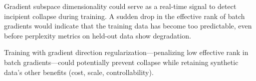  Gradient subspace dimensionality could serve as a real-time signal to detect incipient collapse during training. A sudden drop in the effective rank of batch gradients would indicate that the training data has become too predictable, even before perplexity metrics on held-out data show degradation.

 Training with gradient direction regularization---penalizing low effective rank in batch gradients---could potentially prevent collapse while retaining synthetic data's other benefits (cost, scale, controllability).
